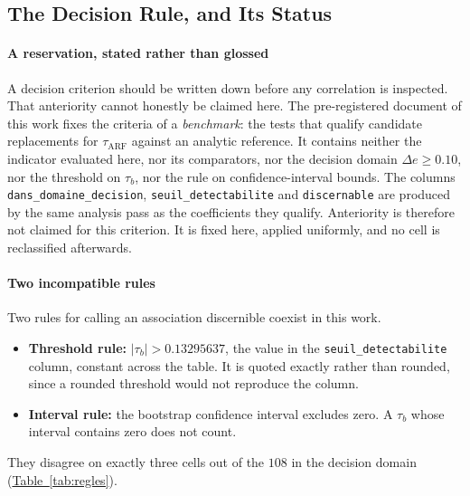\documentclass[10pt,conference]{IEEEtran}
\theoremstyle{definition}
\begin{document}
\subsection{The Decision Rule, and Its Status}
\label{sec:D4rule}

\paragraph{A reservation, stated rather than glossed} A decision criterion should be
written down before any correlation is inspected. That anteriority cannot honestly be
claimed here. The pre-registered document of this work fixes the criteria of a
\emph{benchmark}: the tests that qualify candidate replacements for $\tau_{\mathrm{ARF}}$
against an analytic reference. It contains neither the indicator evaluated here, nor its
comparators, nor the decision domain $\Delta e \ge 0.10$, nor the threshold on $\tau_b$,
nor the rule on confidence-interval bounds. The columns
\texttt{dans\_domaine\_decision}, \texttt{seuil\_detectabilite} and \texttt{discernable}
are produced by the same analysis pass as the coefficients they qualify. Anteriority is
therefore not claimed for this criterion. It is fixed here, applied uniformly, and no cell
is reclassified afterwards.

\paragraph{Two incompatible rules} Two rules for calling an association discernible
coexist in this work.

\begin{itemize}
  \item \textbf{Threshold rule:} $|\tau_b| > 0.13295637$, the value in the
    \texttt{seuil\_detectabilite} column, constant across the table. It is quoted exactly
    rather than rounded, since a rounded threshold would not reproduce the column.
  \item \textbf{Interval rule:} the bootstrap confidence interval excludes zero. A $\tau_b$
    whose interval contains zero does not count.
\end{itemize}

They disagree on exactly three cells out of the $108$ in the decision domain
(\hyperref[tab:regles]{Table~\ref*{tab:regles}}).
\end{document}
